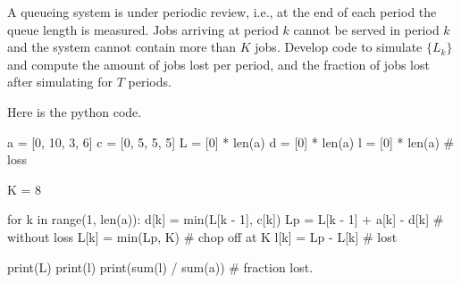 \begin{exercise}\label{ex:l-115}
A queueing system   is  under periodic review, i.e., at the end of each period the queue length is measured.
Jobs arriving at period $k$ cannot be served  in period $k$ and the system cannot contain more than $K$ jobs.
Develop code to simulate $\{L_k\}$ and compute the amount of jobs lost per period, and  the fraction of jobs lost after simulating for $T$ periods.

\begin{solution}

Here is the python code.

\begin{pyconsole}
a = [0, 10, 3, 6]
c = [0, 5, 5, 5]
L = [0] * len(a)
d = [0] * len(a)
l = [0] * len(a)  # loss

K = 8

for k in range(1, len(a)):
    d[k] = min(L[k - 1], c[k])
    Lp = L[k - 1] + a[k] - d[k]  #  without loss
    L[k] = min(Lp, K)  #  chop off at K
    l[k] = Lp - L[k]  #  lost


print(L)
print(l)
print(sum(l) / sum(a))  # fraction lost.
\end{pyconsole}
\end{solution}
\end{exercise}


